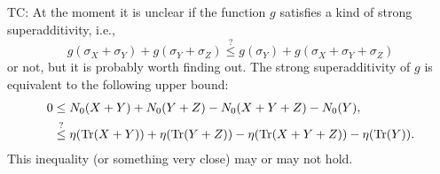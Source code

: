 \documentclass[notitlepage, 10pt]{article}
\begin{document}
{\color{blue}
TC: At the moment it is unclear if the function $g$ satisfies a kind of strong superadditivity, i.e.,
\begin{equation}
    g(\sigma_X + \sigma_Y) + g(\sigma_Y + \sigma_Z) \stackrel{?}{\leq} g(\sigma_Y) + g(\sigma_{X} + \sigma_{Y} + \sigma_{Z})
\end{equation}
or not, but it is probably worth finding out.
The strong superadditivity of $g$ is equivalent to the following upper bound:
\begin{align}
    0 &\leq N_{0}(X+Y) + N_{0}(Y+Z) - N_{0}(X+Y+Z) - N_{0}(Y),\\
    &\stackrel{?}{\leq} \eta(\operatorname{Tr}(X+Y)) + \eta(\operatorname{Tr}(Y+Z)) - \eta(\operatorname{Tr}(X+Y+Z)) - \eta(\operatorname{Tr}(Y)).
\end{align}
This inequality (or something very close) may or may not hold.

}
\end{document}
